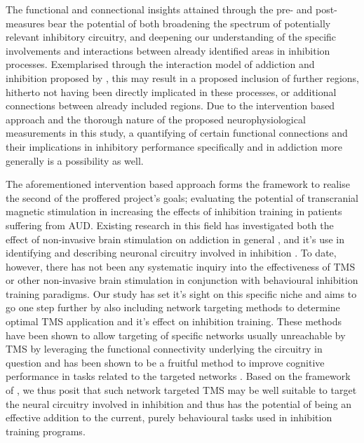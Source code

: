 \documentclass[12pt]{article}
\begin{document}
The functional and connectional insights attained through the pre- and post-measures bear the potential of both broadening the spectrum of potentially relevant inhibitory circuitry, and deepening our understanding of the specific involvements and interactions between already identified areas in inhibition processes. Exemplarised through the interaction model of addiction and inhibition proposed by \textcite{volkowAddictionScienceUncovering2014}, this may result in a proposed inclusion of further regions, hitherto not having been directly implicated in these processes, or additional connections between already included regions. Due to the intervention based approach and the thorough nature of the proposed neurophysiological measurements in this study, a quantifying of certain functional connections and their implications in inhibitory performance specifically and in addiction more generally is a possibility as well.

The aforementioned intervention based approach forms the framework to realise the second of the proffered project's goals; evaluating the potential of transcranial magnetic stimulation in increasing the effects of inhibition training in patients suffering from AUD. Existing research in this field has investigated both the effect of non-invasive brain stimulation on addiction in general \parencite{antonelliTranscranialMagneticStimulation2021,mostafaviNoninvasiveBrainStimulation2020,zhangEffectsRepetitiveTranscranial2019}, and it's use in identifying and describing neuronal circuitry involved in inhibition \parencite{naim-feilCorticalInhibitionMotor2016,quoilinNeuralBasesInhibitory2021}. To date, however, there has not been any systematic inquiry into the effectiveness of TMS or other non-invasive brain stimulation in conjunction with behavioural inhibition training paradigms. Our study has set it's sight on this specific niche and aims to go one step further by also including network targeting methods to determine optimal TMS application and it's effect on inhibition training. These methods have been shown to allow targeting of specific networks usually unreachable by TMS by leveraging the functional connectivity underlying the circuitry in question and has been shown to be a fruitful method to improve cognitive performance in tasks related to the targeted networks \parencite{momiCognitiveEnhancementNetworkTargeted2020}. Based on the framework of \textcite{volkowAddictionScienceUncovering2014}, we thus posit that such network targeted TMS may be well suitable to target the neural circuitry involved in inhibition and thus has the potential of being an effective addition to the current, purely behavioural tasks used in inhibition training programs.
\end{document}
